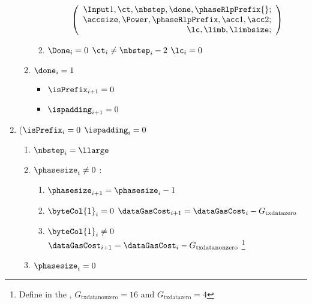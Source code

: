 \begin{enumerate}[resume]
\begin{enumerate}
\begin{enumerate}
\[                        \left( \begin{array}{r}
                            \Input1,
                            \ct,
                            \nbstep,
                            \done,
                            \phaseRlpPrefix{}; \\
                            \accsize,
                            \Power,
                            \phaseRlpPrefix,
                            \acc1,
                            \acc2; \\
                            \lc,
                            \limb,
                            \limbsize; \\
                        \end{array} \right)
                    \]
                \item \If $\Done_{i}=0$ \et $\ct_{i} \neq \nbstep_{i}-2$ \Then $\lc_{i}=0$
            \end{enumerate}
            \item \If $\done_{i}=1$ \Then 
            \begin{itemize}
                \item $\isPrefix_{i+1}=0$
                \item $\ispadding_{i+1}=0$
            \end{itemize}
        \end{enumerate}
        \item \If ($\isPrefix_{i}=0$ \et $\ispadding_{i}=0$ \Then
        \begin{enumerate}
            \item $\nbstep_{i}=\llarge$
            \item \If $\phasesize_{i} \neq 0$ \Then:
            \begin{enumerate}
                \item $\phasesize_{i+1}=\phasesize_{i}-1$
                \item \If $\byteCol{1}_{i}=0$ \Then $\dataGasCost_{i+1} = \dataGasCost_{i} - G_{\mathrm{txdatazero}}$
                \item \If $\byteCol{1}_{i} \neq 0$ \Then $\dataGasCost_{i+1} = \dataGasCost_{i} - G_{\mathrm{txdatanonzero}}$ \footnote{Define in the \cite{EYP-London}, $G_{\mathrm{txdatanonzero}}=16$ and $G_{\mathrm{txdatazero}}=4$}
            \end{enumerate}
            \item \If $\phasesize_{i}=0$ \Then
            \begin{enumerate}

\end{enumerate}
\end{enumerate}
\end{enumerate}
